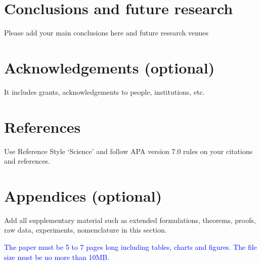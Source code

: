\documentclass[a4paper]{article}
\begin{document}
\section[Conclusions and future research]{Conclusions and future research}

Please add your main conclusions here and future research venues
\textcolor{red}{\lipsum[1-1]}


\section[Acknowledgements (optional)]{Acknowledgements (optional)}

It includes grants, acknowledgements to people, institutions, etc.
\textcolor{red}{\lipsum[1-1]}


\section[References]{References}
Use Reference Style `Science' and follow APA version 7.0 rules on your citations and references.


\section[Appendices (optional)]{ Appendices (optional)}
Add all supplementary material such as extended formulations, theorems, proofs, raw data, experiments, nomenclature in
this section. 


\textcolor{blue}{The paper must be 5 to 7 pages long including tables, charts and figures. The file size must be no more than 10MB.}
\end{document}
